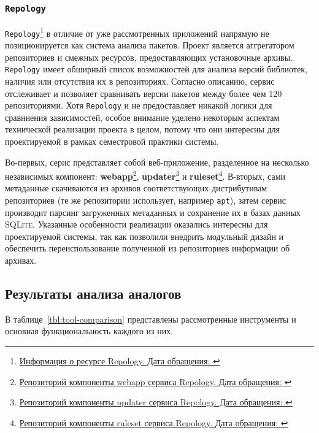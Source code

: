 \subsubsection{\texttt{Repology}}
\texttt{Repology}\footnote{\href{https://repology.org/docs/about}{Информация о ресурсе Repology. Дата обращения: }} в отличие от уже рассмотренных приложений напрямую не позиционируется как система анализа пакетов.
Проект является аггрегатором репозиториев и смежных ресурсов, предоставляющих установочные архивы. \texttt{Repology} имеет обширный список возможностей для анализа версий библиотек, наличия или отсутствия их в репозиториях.
Согласно описанию, сервис отслеживает и позволяет сравнивать версии пакетов между более чем 120 репозиториями.
Хотя \texttt{Repology} и не предоставляет никакой логики для сравннения зависимостей, особое внимание уделено некоторым аспектам технической реализации проекта в целом, потому что они интересны для проектируемой в рамках семестровой практики системы.

Во-первых, серис представляет собой веб-приложение, разделенное на несколько независимых компонент: \textbf{webapp}\footnote{\href{https://github.com/repology/repology-webapp}{Репозиторий компоненты webapp сервиса Repology. Дата обращения: }}, \textbf{updater}\footnote{\href{https://github.com/repology/repology-webapp}{Репозиторий компоненты updater сервиса Repology. Дата обращения: }} и \textbf{ruleset}\footnote{\href{https://github.com/repology/repology-webapp}{Репозиторий компоненты ruleset сервиса Repology. Дата обращения: }}.
В-вторых, сами метаданные скачиваются из архивов соответствующих дистрибутивам репозиториев (те же репозитории использует, например \texttt{apt}), затем сервис производит парсинг загруженных метаданных и сохранение их в базах данных \textsc{SQLite}.
Указанные особенности реализации оказались интересны для проектируемой системы, так как позволили внедрить модульный дизайн и обеспечить переиспользование полученной из репозиториев информации об архивах.

\subsection{Результаты анализа аналогов}
В таблице~\ref{tbl:tool-comparison} представлены рассмотренные инструменты и основная функциональность каждого из них.


